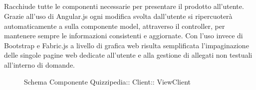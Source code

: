 \subsection{}
Racchiude tutte le componenti necessarie per presentare il prodotto all'utente.
Grazie all'uso di Angular.js ogni modifica svolta dall'utente si ripercuoterà automaticamente a sulla componente model, attraverso il controller, per mantenere sempre le informazioni consistenti e aggiornate.
Con l'uso invece di Bootstrap e Fabric.js a livello di grafica web risulta semplificata l'impaginazione delle singole pagine web dedicate all'utente e alla gestione di allegati non testuali all'interno di domande.
\begin{figure}[H]
\centering
\noindent{}
\caption[Schema Componente ViewClient]{Schema Componente Quizzipedia:: Client:: ViewClient}
\end{figure}
